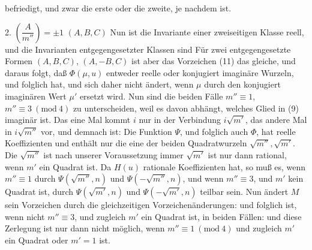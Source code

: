 befriedigt, und zwar die erste oder die zweite, je nachdem
ist.

2.  $\left(\dfrac{A}{m''}\right)=\pm 1$  $(A,B,C)$
Nun ist die Invariante einer zweiseitigen Klasse reell, und die Invarianten entgegengesetzter Klassen sind  Für zwei entgegengesetzte Formen $(A,B,C)$, $(A,-B,C)$ ist aber das Vorzeichen (11) das gleiche, und daraus folgt, daß $\Phi(\mu,u)$ entweder reelle oder konjugiert imaginäre Wurzeln, und folglich  hat, und sich daher nicht ändert, wenn $\mu$ durch den konjugiert imaginären Wert $\mu'$ ersetzt wird. Nun sind die beiden Fälle $m''\equiv 1$, $m''\equiv 3 \ (\mathrm{mod}\ 4)$ zu unterscheiden, weil es davon abhängt, welches Glied in (9) imaginär ist. Das eine Mal kommt $i$ nur in der Verbindung $i\sqrt{m'}$, das andere Mal in $i\sqrt{m''}$ vor, und demnach ist:
Die Funktion $\Psi$, und folglich auch $\Phi$, hat reelle Koeffizienten und enthält nur die eine der beiden Quadratwurzeln $\sqrt{m''}, \sqrt{m'}$. Die $\sqrt{m''}$ ist nach unserer Voraussetzung immer  $\sqrt{m'}$ ist nur dann rational, wenn $m'$ ein Quadrat ist. Da $H(u)$ rationale Koeffizienten hat, so muß es, wenn $m''\equiv 1$ durch $\Psi(\sqrt{m''},n)$ und $\Psi(-\sqrt{m''},n)$, und wenn $m''\equiv 3$, und $m'$ kein Quadrat ist, durch $\Psi(\sqrt{m'},n)$ und $\Psi(-\sqrt{m'},n)$ teilbar sein.
Nun ändert $M$ sein Vorzeichen durch die gleichzeitigen Vorzeichenänderungen:
und folglich ist, wenn nicht $m''\equiv 3$, und zugleich $m'$ ein Quadrat ist, in beiden Fällen:
und diese Zerlegung ist nur dann nicht möglich, wenn $m''\equiv 1 \ (\mathrm{mod}\ 4)$ und zugleich $m'$ ein Quadrat oder $m'=1$ ist.
